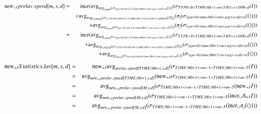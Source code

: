 %
\begin{eqnarray*}
\algnew_{+I} prelav.speed[m,s,d] 
&=& \algincr ( \algavg_{\algavg_{speed}(\sigma_ {type=0 \wedge id = I.V \wedge time/60 +1 = m \wedge seg = s \wedge dir = d } \{\tuple{}\}} ( \sigma_ {TYPE=0 \wedge TIME/60 +1 = m \wedge SEG = s \wedge DIR = d } (I) ) \\
&& + \algavg_{\algavg_{SPEED} (\sigma_ {TYPE=0 \wedge ID = I.V \wedge TIME/60 +1 = m \wedge SEG = s \wedge DIR = d } (I2))} (\pi_{\vec{i}} (\sigma_ {type=0 \wedge time/60 +1 = m \wedge seg = s \wedge dir = d } \{\tuple{}\}) )\\
&& + \algavg_{\algavg_{speed}(\sigma_ {type=0 \wedge id = I.V \wedge time/60 +1 = m \wedge seg = s \wedge dir = d } \{\tuple{}\}} (\pi_{\vec{i}} (\sigma_ {type=0 \wedge time/60 +1 = m \wedge seg = s \wedge dir = d } \{\tuple{}\}) )\\
%
&=& \algincr ( \algavg_{\algavg_{speed}(\sigma_ {type=0 \wedge id = I.V \wedge time/60 +1 = m \wedge seg = s \wedge dir = d } \{\tuple{}\}} ( \sigma_ {TYPE=0 \wedge TIME/60 +1 = m \wedge SEG = s \wedge DIR = d } (I) ) \\
&& + \algavg_{\algavg_{SPEED} (\sigma_ {TYPE=0 \wedge ID = id \wedge TIME/60 +1 = m \wedge SEG = s \wedge DIR = d } (I2))}  (\sigma_ {type=0 \wedge time/60 +1 = m \wedge seg = s \wedge dir = d } \{\tuple{}\})\\
&& + \algavg_{\algavg_{speed}(\sigma_ {type=0 \wedge id = id \wedge time/60 +1 = m \wedge seg = s \wedge dir = d } \{\tuple{}\}} (\sigma_ {type=0 \wedge time/60 +1 = m \wedge seg = s \wedge dir = d } \{\tuple{}\}) 
\end{eqnarray*}
\begin{eqnarray*}
\mathrm{new}_{+I} Statistics.lav[m,s,d] 
&=& \mathrm{new}_{+I} \mathrm{avg}_{prelav.speed[TIME/60+1,s,d]} (\sigma_{TIME/60+1 <= m-1 \wedge TIME/60+1 >= m-5} (I))\\
&=& \mathrm{avg}_{\mathrm{new}_{+I} prelav.speed[TIME/60+1,s,d]} (\mathrm{new}_{+I} \sigma_{TIME/60+1 <= m-1 \wedge TIME/60+1 >= m-5} (I))\\
&=& \mathrm{avg}_{\mathrm{new}_{+I} prelav.speed[M,s,d]} (\sigma_{TIME/60+1<=m-1 \wedge TIME/60+1 >= m-5} (\mathrm{new}_{+I} I)) \\
&=& \mathrm{avg}_{\mathrm{new}_{+I} prelav.speed[M,s,d]} (\sigma_{TIME/60+1<=m-1 \wedge TIME/60+1 >= m-5} (\mathrm{incr}_{\cup} \Delta_{+I}I))\\
&=& \mathrm{avg}_{\mathrm{new}_{+I} prelav.speed[M,s,d]} (\sigma_{TIME/60+1<=m-1 \wedge TIME/60+1 >= m-5} (\mathrm{incr}_{\cup} \pi_{\vec{i}} \{{\langle\rangle}\}))
\end{eqnarray*}
